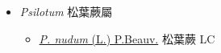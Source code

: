 
  \begin{itemize}
 \item[    ] \textit{Psilotum} 松葉蕨屬
                                
  \begin{itemize}
        \item[] \href{http://www.theplantlist.org/tpl1.1/search?q=Psilotum+nudum}{\textit{P. nudum} (L.) P.Beauv.}   松葉蕨   LC
  \end{itemize}
  \end{itemize}
